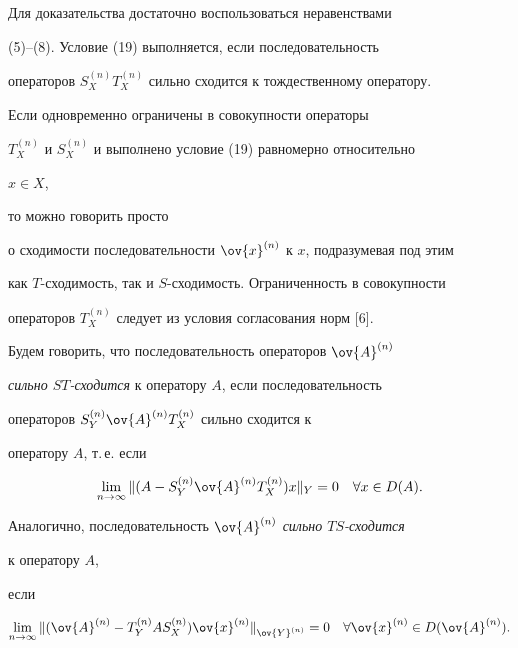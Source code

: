 Для доказательства достаточно воспользоваться неравенствами


(5)--(8). Условие (19) выполняется, если последовательность


операторов $S^{(n)}_XT^{(n)}_X$ сильно сходится к тождественному оператору.





\begin{notenonum} Если одновременно ограничены в совокупности операторы


$T^{(n)}_X$ и $S^{(n)}_X$ и выполнено условие (19) равномерно относительно


$x\in X$,


то можно говорить просто


о сходимости последовательности $\ov{x}^{(n)}$ к $x$, подразумевая под этим


как $T$-сходимость, так и $S$-сходимость. Ограниченность в совокупности


операторов $T_X^{(n)}$ следует из условия согласования норм [6].


\end{notenonum}





Будем говорить, что последовательность операторов $\ov{A}^{(n)}$


{\it сильно $ST$-сходится} к оператору $A$, если последовательность


операторов $S^{(n)}_Y\ov{A}^{(n)} T^{(n)}_X$ сильно сходится к


оператору $A$, т.\,е. если


\begin{equation}


\lim_{n\to\infty}\nr{(A-S^{(n)}_Y\ov{A}^{(n)} T^{(n)}_X)x}_Y = 0


\quad \forall x\in D(A).


\end{equation}


Аналогично, последовательность $\ov{A}^{(n)}$ {\it сильно $TS$-сходится}


к оператору $A$,


если


\begin{equation}


\lim_{n\to\infty}\nr{(\ov{A}^{(n)}-T^{(n)}_Y


AS^{(n)}_X)\ov{x}^{(n)}}_{\ov{Y}^{(n)}} = 0


\quad \forall \ov{x}^{(n)}\in D(\ov{A}^{(n)}).


\end{equation}


